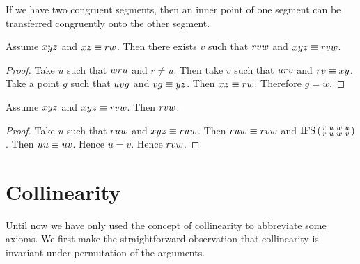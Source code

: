 \documentclass[10pt,a4paper,parskip=half,numbers=endperiod,parskip]{scrartcl}
\begin{document}
  If we have two congruent segments, then an inner point of one segment
  can be transferred congruently onto the other segment.

  \begin{forthel}
    \begin{lemma} %
      Assume $x y z$ and $x z \equiv r w$.
      Then there exists $v$ such that $r v w$ and $x y z \equiv r v w$.
    \end{lemma}
    \begin{proof}
      Take $u$ such that $w r u$ and $r \neq u$.
      Then take $v$ such that $u r v$ and $r v \equiv x y$.
      Take a point $g$ such that $u v g$ and $v g \equiv y z$.
      Then $x z \equiv r w$.
      Therefore $g = w$.
    \end{proof}

    \begin{lemma} %
      Assume $x y z$ and $x y z \equiv r v w$.
      Then $r v w$.
    \end{lemma}
    \begin{proof}
      Take $u$ such that $r u w$ and $x y z \equiv r u w$.
      Then $r u w \equiv r v w$ and $\operatorname{IFS} \left( \begin{smallmatrix} r & u & w & u \\ r & u & w & v \end{smallmatrix} \right)$.
      Then $u u \equiv u v$.
      Hence $u = v$.
      Hence $r v w$.
    \end{proof}
  \end{forthel}

  \section{Collinearity}

  Until now we have only used the concept of collinearity to abbreviate some axioms.
  We first make the straightforward observation that
  collinearity is invariant under permutation of the arguments.
\end{document}
